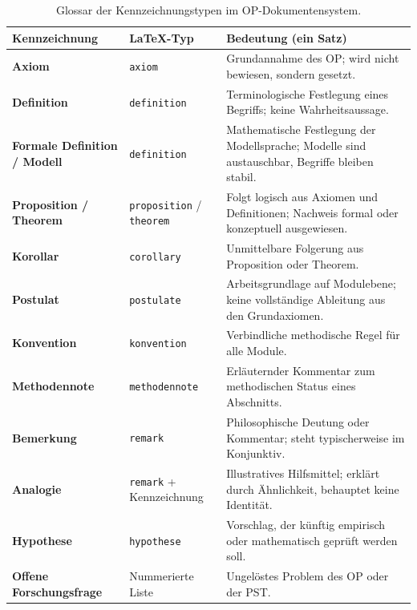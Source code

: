 \documentclass[11pt,a4paper]{article}
\theoremstyle{plain}
\theoremstyle{definition}
\begin{document}
\begin{table}[h!]
\centering\small
\begin{tabular}{p{3.5cm}p{1.8cm}p{8.2cm}}
  \toprule
  \textbf{Kennzeichnung} & \textbf{LaTeX-Typ} & \textbf{Bedeutung (ein Satz)} \\
  \midrule
  \textbf{Axiom} & \texttt{axiom} &
    Grundannahme des OP; wird nicht bewiesen, sondern gesetzt. \\[3pt]
  \textbf{Definition} & \texttt{definition} &
    Terminologische Festlegung eines Begriffs; keine Wahrheitsaussage. \\[3pt]
  \textbf{Formale Definition / Modell} & \texttt{definition} &
    Mathematische Festlegung der Modellsprache; Modelle sind austauschbar,
    Begriffe bleiben stabil. \\[3pt]
  \textbf{Proposition / Theorem} & \texttt{proposition} / \texttt{theorem} &
    Folgt logisch aus Axiomen und Definitionen; Nachweis formal oder
    konzeptuell ausgewiesen. \\[3pt]
  \textbf{Korollar} & \texttt{corollary} &
    Unmittelbare Folgerung aus Proposition oder Theorem. \\[3pt]
  \textbf{Postulat} & \texttt{postulate} &
    Arbeitsgrundlage auf Modulebene; keine vollst\"{a}ndige Ableitung
    aus den Grundaxiomen. \\[3pt]
  \textbf{Konvention} & \texttt{konvention} &
    Verbindliche methodische Regel f\"{u}r alle Module. \\[3pt]
  \textbf{Methodennote} & \texttt{methodennote} &
    Erl\"{a}uternder Kommentar zum methodischen Status eines Abschnitts. \\[3pt]
  \textbf{Bemerkung} & \texttt{remark} &
    Philosophische Deutung oder Kommentar; steht typischerweise im Konjunktiv. \\[3pt]
  \textbf{Analogie} & \texttt{remark} + Kennzeichnung &
    Illustratives Hilfsmittel; erkl\"{a}rt durch \"{A}hnlichkeit, behauptet
    keine Identit\"{a}t. \\[3pt]
  \textbf{Hypothese} & \texttt{hypothese} &
    Vorschlag, der k\"{u}nftig empirisch oder mathematisch gepr\"{u}ft
    werden soll. \\[3pt]
  \textbf{Offene Forschungsfrage} & Nummerierte Liste &
    Ungel\"{o}stes Problem des OP oder der PST. \\
  \bottomrule
\end{tabular}
\caption{Glossar der Kennzeichnungstypen im OP-Dokumentensystem.}
\end{table}
\end{document}
